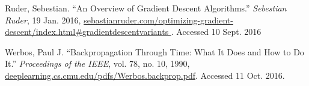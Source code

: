 \documentclass[12pt, titlepage]{article}
\begin{document}
\begin{thebibliography}{9}
		Ruder, Sebestian. ``An Overview of Gradient Descent Algorithms.''
		\textit{Sebestian Ruder}, 19 Jan. 2016,
		\url{sebastianruder.com/optimizing-gradient-descent/index.html#gradientdescentvariants
		}. Accessed 10 Sept. 2016

		Werbos, Paul J. ``Backpropagation Through Time: What It Does and How to
		Do It.'' \textit{Proceedings of the IEEE}, vol. 78, no. 10, 1990,
		\url{deeplearning.cs.cmu.edu/pdfs/Werbos.backprop.pdf}. Accessed 11 Oct.
		2016.

\end{thebibliography}

\end{document}
